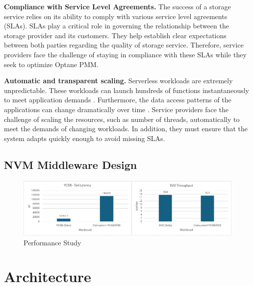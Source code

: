 \textbf{Compliance with Service Level Agreements.} The success of a storage service relies on its ability to comply with various service level agreements (SLAs). SLAs play a critical role in governing the relationship between the storage provider and its customers. They help establish clear expectations between both parties regarding the quality of storage service. Therefore, service providers face the challenge of staying in compliance with these SLAs while they seek to optimize Optane PMM. 

\textbf{Automatic and transparent scaling.} Serverless workloads are extremely unpredictable. These workloads can launch hundreds of functions instantaneously to meet application demands \cite{klimovic2018understanding}. Furthermore, the data access patterns of the applications can change dramatically over time \cite{romero2021faa,wu2019autoscaling}. Service providers face the challenge of scaling the resources, such as number of threads, automatically to meet the demands of changing workloads. In addition, they must ensure that the system adapts quickly enough to avoid missing SLAs.


\subsection{NVM Middleware Design}

\begin{figure}[ht]
  \centering
  \includegraphics[scale=0.6]{images/nvm-motivation-sla.png}
  \caption[Performance Study]{Performance Study}
\end{figure}

\section{Architecture}

